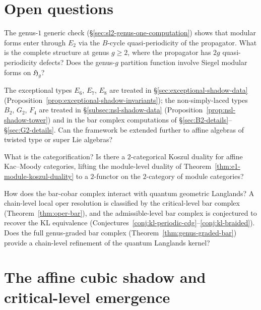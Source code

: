 \section{Open questions}

\begin{question}
The genus-$1$ generic check
(\S\ref{sec:sl2-genus-one-computation}) shows that modular forms enter
through $E_2$ via the $B$-cycle quasi-periodicity of the propagator.
What is the complete structure at genus $g \geq 2$, where the
propagator has $2g$ quasi-periodicity defects? Does the genus-$g$
partition function involve Siegel modular forms on $\mathfrak{H}_g$?
\end{question}

\begin{question}
The exceptional types $E_6$, $E_7$, $E_8$ are treated in \S\ref{sec:exceptional-shadow-data} (Proposition~\ref{prop:exceptional-shadow-invariants}); the non-simply-laced types $B_2$, $G_2$, $F_4$ are treated in \S\ref{subsec:nsl-shadow-data} (Proposition~\ref{prop:nsl-shadow-tower}) and in the bar complex computations of \S\ref{sec:B2-details}--\S\ref{sec:G2-details}. Can the framework be extended further to affine algebras of twisted type or super Lie algebras?
\end{question}

\begin{question}
What is the categorification? Is there a $2$-categorical Koszul
duality for affine Kac--Moody categories, lifting the module-level
duality of Theorem~\ref{thm:e1-module-koszul-duality} to a
$2$-functor on the $2$-category of module categories?
\end{question}

\begin{question}
How does the bar-cobar complex interact with quantum geometric
Langlands? A
chain-level local oper resolution is classified by the critical-level bar complex
(Theorem~\ref{thm:oper-bar}), and the admissible-level bar
complex is conjectured to recover the KL equivalence
(Conjectures~\ref{conj:kl-periodic-cdg}--\ref{conj:kl-braided}). Does the full genus-graded
bar complex (Theorem~\ref{thm:genus-graded-bar}) provide a
chain-level refinement of the quantum Langlands kernel?
\end{question}

\section{The affine cubic shadow and critical-level emergence}%
\label{sec:affine-cubic-shadow}

